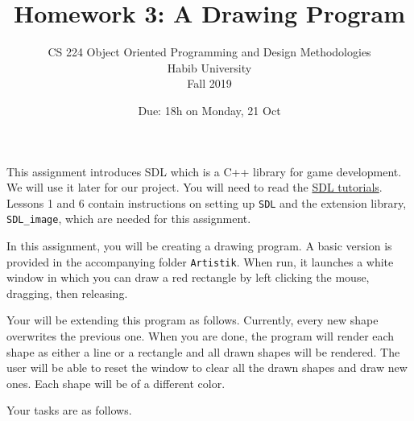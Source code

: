 \documentclass[addpoints]{exam}
\title{Homework 3: A Drawing Program}
\author{CS 224 Object Oriented Programming and Design Methodologies\\Habib University\\Fall 2019}
\date{Due: 18h on Monday, 21 Oct}
\begin{document}
\maketitle
\thispagestyle{empty}

This assignment introduces SDL which is a C++ library for game development. We will use it later for our project. You will need to read the \href{http://lazyfoo.net/tutorials/SDL/}{SDL tutorials}. Lessons 1 and 6 contain instructions on setting up \texttt{SDL} and the extension library, \texttt{SDL\_image}, which are needed for this assignment.

\begin{questions}

In this assignment, you will be creating a drawing program. A basic version is provided in the accompanying folder \texttt{Artistik}. When run, it launches a white window in which you can draw a red rectangle by left clicking the mouse, dragging, then releasing. 

Your will be extending this program as follows. Currently, every new shape overwrites the previous one. When you are done, the program will render each shape as either a line or a rectangle and all drawn shapes will be rendered. The user will be able to reset the window to clear all the drawn shapes and draw new ones. Each shape will be of a different color.

Your tasks are as follows.
\end{questions}
\end{document}
